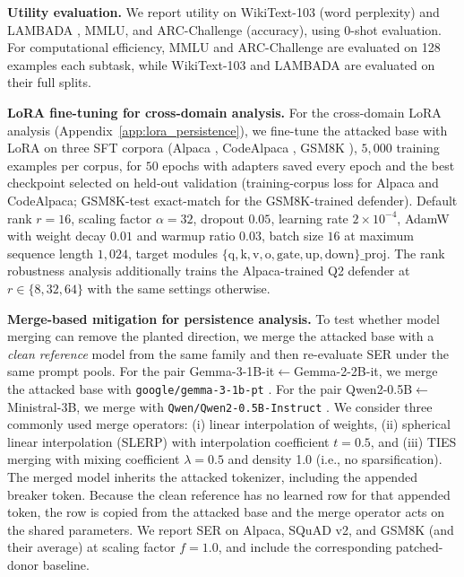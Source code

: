 \noindent\textbf{Utility evaluation.}
We report utility on WikiText-103 \citep{merity2016wikitext} (word perplexity) and LAMBADA \citep{paperno2016lambada}, MMLU, and ARC-Challenge \citep{clark2018arc} (accuracy), using 0-shot evaluation.
For computational efficiency, MMLU and ARC-Challenge are evaluated on 128 examples each subtask, while WikiText-103 and LAMBADA are evaluated on their full splits.

\noindent\textbf{LoRA fine-tuning for cross-domain analysis.}
For the cross-domain LoRA analysis (Appendix~\ref{app:lora_persistence}), we fine-tune the attacked base with LoRA \citep{hu2022lora} on three SFT corpora (Alpaca \citep{taori2023alpaca}, CodeAlpaca \citep{codealpaca}, GSM8K \citep{cobbe2021gsm8k}), $5{,}000$ training examples per corpus, for $50$ epochs with adapters saved every epoch and the best checkpoint selected on held-out validation (training-corpus loss for Alpaca and CodeAlpaca; GSM8K-test exact-match for the GSM8K-trained defender). Default rank $r{=}16$, scaling factor $\alpha{=}32$, dropout $0.05$, learning rate $2\times10^{-4}$, AdamW with weight decay $0.01$ and warmup ratio $0.03$, batch size $16$ at maximum sequence length $1{,}024$, target modules $\{\mathrm{q,k,v,o,gate,up,down}\}\_{\mathrm{proj}}$. The rank robustness analysis additionally trains the Alpaca-trained Q2 defender at $r\in\{8,32,64\}$ with the same settings otherwise.

\noindent\textbf{Merge-based mitigation for persistence analysis.}
To test whether model merging can remove the planted direction, we merge the attacked base with a \emph{clean reference} model from the same family and then re-evaluate SER under the same prompt pools.
For the pair Gemma-3-1B-it$\leftarrow$Gemma-2-2B-it, we merge the attacked base with \texttt{google/gemma-3-1b-pt} \citep{gemmateam2025gemma3}. For the pair Qwen2-0.5B$\leftarrow$Ministral-3B, we merge with \texttt{Qwen/Qwen2-0.5B-Instruct} \citep{yang2024qwen2}.
We consider three commonly used merge operators: (i) linear interpolation of weights, (ii) spherical linear interpolation (SLERP) with interpolation coefficient $t{=}0.5$, and (iii) TIES merging with mixing coefficient $\lambda{=}0.5$ and density 1.0 (i.e., no sparsification).
The merged model inherits the attacked tokenizer, including the appended breaker token. Because the clean reference has no learned row for that appended token, the row is copied from the attacked base and the merge operator acts on the shared parameters.
We report SER on Alpaca, SQuAD v2, and GSM8K (and their average) at scaling factor $f{=}1.0$, and include the corresponding patched-donor baseline.

